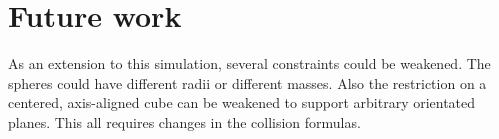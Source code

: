 \documentclass[journal, letterpaper]{IEEEtran}
\begin{document}
\section{Future work}
As an extension to this simulation, several constraints could be weakened. The spheres could have different radii or different masses. Also the restriction on a centered, axis-aligned cube can be weakened to support arbitrary orientated planes. This all requires changes in the collision formulas.
\end{document}
